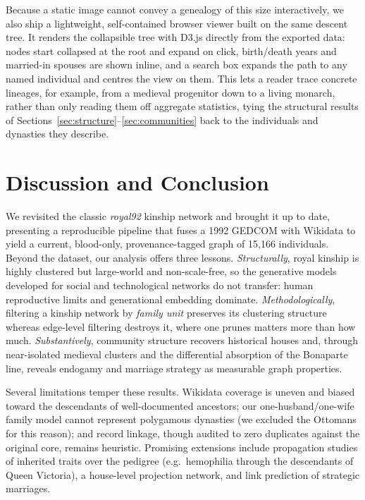 Because a static image cannot convey a genealogy of this size interactively, we
also ship a lightweight, self-contained browser viewer built on the same descent
tree. It renders the collapsible tree with \textsf{D3.js} directly from the
exported data: nodes start collapsed at the root and expand
on click, birth/death years and married-in spouses are shown inline, and a search
box expands the path to any named individual and centres the view on them. This
lets a reader trace concrete lineages, for example, from a medieval progenitor
down to a living monarch, rather than only reading them off aggregate statistics,
tying the structural results of Sections~\ref{sec:structure}--\ref{sec:communities} back
to the individuals and dynasties they describe.

\section{Discussion and Conclusion}
\label{sec:conclusion}

We revisited the classic \emph{royal92} kinship network and brought it up to date,
presenting a reproducible pipeline that fuses a 1992 GEDCOM with Wikidata to yield
a current, blood-only, provenance-tagged graph of 15{,}166 individuals. Beyond the
dataset, our analysis offers three lessons. \emph{Structurally}, royal kinship is
highly clustered but large-world and non-scale-free, so the generative models
developed for social and technological networks do not transfer: human
reproductive limits and generational embedding dominate. \emph{Methodologically},
filtering a kinship network by \emph{family unit} preserves its clustering
structure whereas edge-level filtering destroys it, where one prunes matters more
than how much. \emph{Substantively}, community structure recovers historical
houses and, through near-isolated medieval clusters and the differential
absorption of the Bonaparte line, reveals endogamy and marriage strategy as
measurable graph properties.

Several limitations temper these results. Wikidata coverage is uneven and biased
toward the descendants of well-documented ancestors; our one-husband/one-wife
family model cannot represent polygamous dynasties (we excluded the Ottomans for
this reason); and record linkage, though audited to zero duplicates against the
original core, remains heuristic. Promising extensions include propagation studies
of inherited traits over the pedigree (e.g.\ hemophilia through the descendants of
Queen Victoria), a house-level projection network, and link prediction of
strategic marriages.





